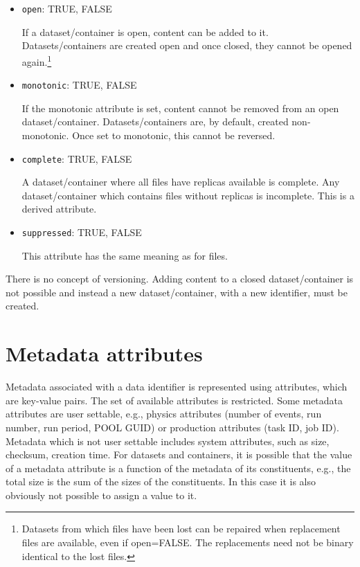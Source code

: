 \documentclass{atlasnote}
\begin{document}
\begin{itemize}
\item{} \texttt{open}: TRUE, FALSE

If a dataset/container is open, content can be added to it. Datasets/containers are created open and once closed, they cannot be opened again.\footnote{Datasets from which files have been lost can be repaired when replacement files are available, even if open=FALSE. The replacements need not be binary identical to the lost files.}

\item{} \texttt{monotonic}: TRUE, FALSE

If the monotonic attribute is set, content cannot be removed from an open dataset/container. Datasets/containers are, by default, created non-monotonic. Once set to monotonic, this cannot be reversed.

\item{} \texttt{complete}: TRUE, FALSE

A dataset/container where all files have replicas available is complete. Any dataset/container which contains files without replicas is incomplete. This is a derived attribute.

\item{} \texttt{suppressed}: TRUE, FALSE

This attribute has the same meaning as for files.
\end{itemize}

\noindent There is no concept of versioning. Adding content to a closed dataset/container is not possible and instead a new dataset/container, with a new identifier, must be created.

\section{Metadata attributes}

Metadata associated with a data identifier is represented using attributes, which are key-value pairs. The set of available attributes is restricted. Some metadata attributes are user settable, e.g., physics attributes (number of events, run number, run period, POOL GUID) or production attributes (task ID, job ID). Metadata which is not user settable includes system attributes, such as size, checksum, creation time. For datasets and containers, it is possible that the value of a metadata attribute is a function of the metadata of its constituents, e.g., the total size is the sum of the sizes of the constituents. In this case it is also obviously not possible to assign a value to it.
\end{document}
